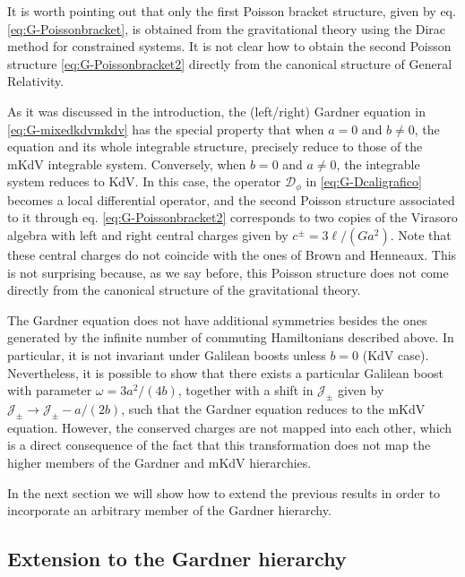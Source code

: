 \documentclass[letterpaper,11pt,oneside]{book}
\begin{document}
It is worth pointing out that only the first Poisson bracket structure,
given by eq. \eqref{eq:G-Poissonbracket}, is obtained from the gravitational
theory using the Dirac method for constrained systems. It is not clear
how to obtain the second Poisson structure \eqref{eq:G-Poissonbracket2}
directly from the canonical structure of General Relativity.

As it was discussed in the introduction, the (left/right) Gardner
equation in \eqref{eq:G-mixedkdvmkdv} has the special property that
when $a=0$ and $b\neq0$, the equation and its whole integrable structure,
precisely reduce to those of the mKdV integrable system. Conversely,
when $b=0$ and $a\neq0$, the integrable system reduces to KdV. In
this case, the operator $\mathcal{D}_{\phi}$ in \eqref{eq:G-Dcaligrafico}
becomes a local differential operator, and the second Poisson structure
associated to it through eq. \eqref{eq:G-Poissonbracket2} corresponds
to two copies of the Virasoro algebra with left and right central
charges given by $c^{\pm}=3\ell/\left(Ga^{2}\right)$. Note that these
central charges do not coincide with the ones of Brown and Henneaux.
This is not surprising because, as we say before, this Poisson structure
does not come directly from the canonical structure of the gravitational
theory.

The Gardner equation does not have additional symmetries besides the
ones generated by the infinite number of commuting Hamiltonians described
above. In particular, it is not invariant under Galilean boosts unless
$b=0$ (KdV case). Nevertheless, it is possible to show that there
exists a particular Galilean boost with parameter $\omega=3a^{2}/\left(4b\right)$,
together with a shift in $\mathcal{J_{\pm}}$ given by $\mathcal{J_{\pm}}\rightarrow\mathcal{J_{\pm}}-a/\left(2b\right)$,
such that the Gardner equation reduces to the mKdV equation. However,
the conserved charges are not mapped into each other, which is a direct
consequence of the fact that this transformation does not map the
higher members of the Gardner and mKdV hierarchies.

In the next section we will show how to extend the previous results
in order to incorporate an arbitrary member of the Gardner hierarchy.

\subsection{Extension to the Gardner hierarchy\label{sec:G-hierarchy}}
\end{document}
